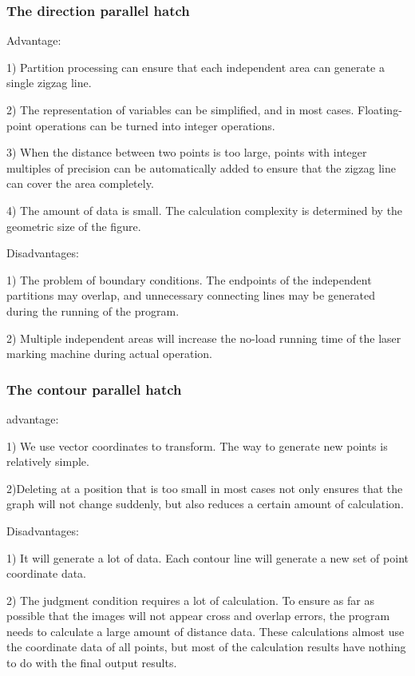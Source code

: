 \documentclass{apmcmthesis}
\begin{document}
\subsubsection{The direction parallel hatch}

Advantage:


1) Partition processing can ensure that each independent area can generate a single zigzag line.


2) The representation of variables can be simplified, and in most cases. Floating-point operations can be turned into integer operations.


3) When the distance between two points is too large, points with integer multiples of precision can be automatically added to ensure that the zigzag line can cover the area completely.


4) The amount of data is small. The calculation complexity is determined by the geometric size of the figure.


Disadvantages:


1) The problem of boundary conditions. The endpoints of the independent partitions may overlap, and unnecessary connecting lines may be generated during the running of the program.


2) Multiple independent areas will increase the no-load running time of the laser marking machine during actual operation.


\subsubsection{The contour parallel hatch}


advantage:


1) We use vector coordinates to transform. The way to generate new points is relatively simple.


2)Deleting at a position that is too small in most cases not only ensures that the graph will not change suddenly, but also reduces a certain amount of calculation.


Disadvantages:


1) It will generate a lot of data. Each contour line will generate a new set of point coordinate data.


2) The judgment condition requires a lot of calculation. To ensure as far as possible that the images will not appear cross and overlap errors, the program needs to calculate a large amount of distance data. These calculations almost use the coordinate data of all points, but most of the calculation results have nothing to do with the final output results.
\end{document}
